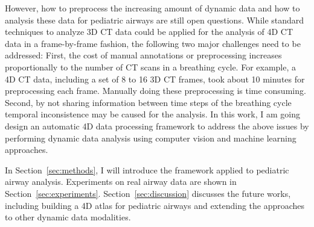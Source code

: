 However, how to preprocess the increasing amount of dynamic data and how to analysis these data for pediatric airways are still open questions.
While standard techniques to analyze 3D CT data could be applied for the analysis of 4D CT data in a frame-by-frame fashion, the following two major challenges need to be addressed:
First, the cost of manual annotations or preprocessing increases proportionally to the number of CT scans in a breathing cycle.
For example, a 4D CT data, including a set of 8 to 16 3D CT frames, took about 10 minutes for preprocessing each frame.
Manually doing these preprocessing is time consuming.
Second, by not sharing information between time steps of the breathing cycle temporal inconsistence may be caused for the analysis.
In this work, I am going design an automatic 4D data processing framework to address the above issues by performing dynamic data analysis using computer vision and machine learning approaches.

In Section~\ref{sec:methods}, I will introduce the framework applied to pediatric airway analysis.
Experiments on real airway data are shown in Section~\ref{sec:experiments}.
Section~\ref{sec:discussion} discusses the future works, including building a 4D atlas for pediatric airways and extending the approaches to other dynamic data modalities.
